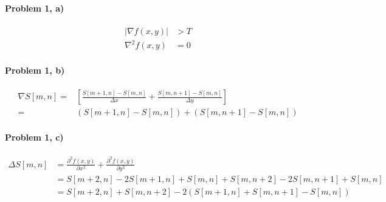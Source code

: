 \documentclass[11pt]{article}
\begin{document}
\MakeScribeTop


\paragraph{\noindent\textbf{\LARGE{Problem 1, a)}}}

  
\begin{equation*}
\begin{split}
    |\nabla f(x,y)| &> T \\
    \nabla^2 f(x,y) &= 0 
\end{split}
\end{equation*}

\paragraph{\noindent\textbf{\LARGE{Problem 1, b)}}}  
\begin{equation*}
\begin{split}
    \nabla S[m,n] = & [ \frac{S[m+1,n] - S[m,n]}{\Delta x} + \frac{S[m,n+1] - S[m,n]}{\Delta y}] \\
                  =  & (S[m+1,n] - S[m,n]) + (S[m,n+1] - S[m,n])
\end{split}
\end{equation*}

\paragraph{\noindent\textbf{\LARGE{Problem 1, c)}}}  
\begin{equation*}
\begin{split}
    \Delta S[m,n]   &= \frac{\partial^2 f(x,y)}{\partial x^2} + \frac{\partial^2 f(x,y)}{\partial y^2} \\
                    &= S[m+2,n] - 2S[m+1,n] + S[m,n] + S[m,n+2] - 2S[m,n+1] + S[m,n] \\
                    &= S[m+2,n] + S[m,n+2] - 2( S[m+1,n] + S[m,n+1] - S[m,n] )
\end{split}
\end{equation*}
\end{document}
